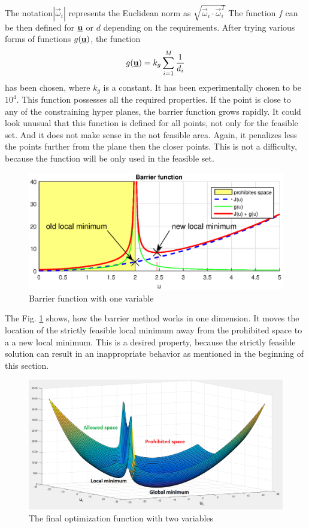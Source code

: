 \documentclass[a4paper,11pt,titlepage]{article}
\newcommand{\uvec}{\textbf{\underline{u}}}
\newcommand{\macoi}{\vec{\omega}_i}
\begin{document}
The notation$|\macoi|$ represents the Euclidean norm as $\sqrt{\macoi \cdot \macoi^T}$ The function $f$ can be then defined for $\uvec$ or $d$ depending on the requirements. After trying various forms of functions $g(\uvec)$, the function
\begin{equation}
\label{eq:barrier_function}
g(\uvec) = k_g\sum_{i = 1}^M \frac{1}{d_i} 
\end{equation}
has been chosen, where $k_g$ is a constant. It has been experimentally chosen to be $10^4$. This function possesses all the required properties. If the point is close to any of the constraining hyper planes, the barrier function grows rapidly. It could look unusual that this function is defined for all points, not only for the feasible set. And it does not make sense in the not feasible area. Again, it penalizes less the points further from the plane then the closer points. This is not a difficulty, because the function will be only used in the feasible set.
\begin{figure}[h]
\centering
\includegraphics[width=1\textwidth]{fig/barrier_function2.eps}
\caption{Barrier function with one variable}
\label{fig:barrier_function}
\end{figure}

The Fig. \ref{fig:barrier_function} shows, how the barrier method works in one dimension. It moves the location of the strictly feasible local minimum away from the prohibited space to a a new local minimum. This is a desired property, because the strictly feasible solution can result in an inappropriate behavior as mentioned in the beginning of this section. 

\begin{figure}[h]
\centering
\includegraphics[width=1\textwidth]{fig/LQCP2D.png}
\caption{The final optimization function with two variables}
\label{fig:barrier_function_3D}
\end{figure}
\end{document}
